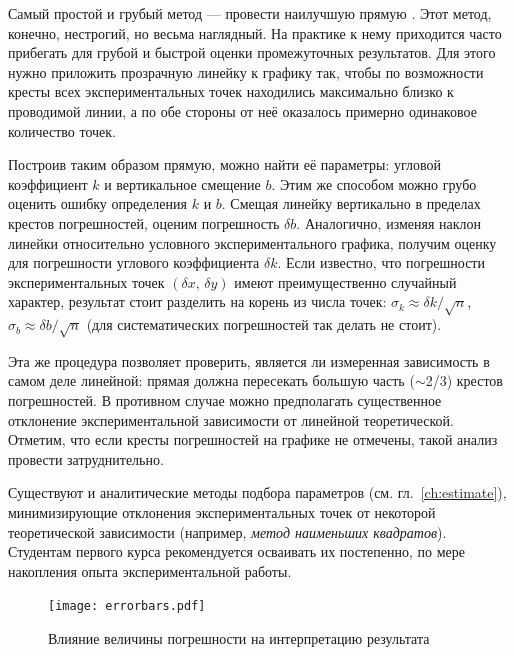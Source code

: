 Самый простой и грубый метод --- провести наилучшую прямую
. Этот метод, конечно, нестрогий,
но весьма наглядный. На практике к нему приходится часто прибегать
для грубой и быстрой оценки промежуточных результатов. Для этого нужно
приложить прозрачную линейку к графику так, чтобы по возможности кресты
всех экспериментальных точек находились максимально близко к проводимой
линии, а по обе стороны от неё оказалось примерно одинаковое количество
точек.


Построив таким образом  прямую,
можно найти её параметры: угловой коэффициент $k$ и вертикальное
смещение $b$. Этим же способом можно грубо оценить ошибку определения
$k$ и $b$. Смещая линейку вертикально в пределах крестов погрешностей,
оценим погрешность $\delta b$. Аналогично, изменяя наклон линейки
относительно условного 
экспериментального графика, получим оценку для погрешности углового
коэффициента $\delta k$. Если известно, что погрешности экспериментальных точек $\left(\delta x,\,\delta y\right)$ имеют преимущественно случайный характер, результат стоит разделить на корень из числа точек:
$\sigma_{k}\approx\delta k/\sqrt{n}$,
$\sigma_{b}\approx\delta b/\sqrt{n}$ (для систематических погрешностей
так делать не стоит).

Эта же процедура позволяет проверить, является ли измеренная зависимость в самом деле линейной: прямая должна пересекать большую часть ($\sim$2/3) крестов погрешностей. В противном случае можно предполагать существенное отклонение экспериментальной зависимости от линейной теоретической. Отметим, что если кресты погрешностей на графике не отмечены, такой анализ провести затруднительно.

Существуют и аналитические методы подбора параметров 
(см. гл.~\ref{ch:estimate}), минимизирующие отклонения экспериментальных точек от некоторой теоретической зависимости
(например, \emph{метод наименьших квадратов}). Студентам первого курса
рекомендуется осваивать их постепенно, по мере накопления опыта экспериментальной работы.

\begin{figure}[h!]
    \centering
    \texttt{[image: errorbars.pdf]}
    \caption{Влияние величины погрешности на интерпретацию результата}
    \label{fig:graph-method}
\end{figure}


